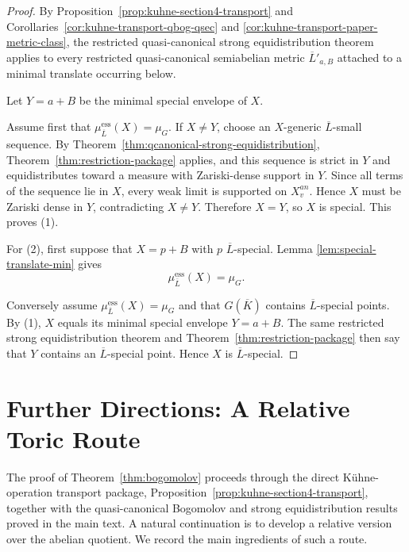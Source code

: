 \documentclass[10pt,a4paper]{amsart}
\theoremstyle{plain}
\theoremstyle{plain}
\numberwithin{equation}{section}
\providecommand{\bL}{\overline{L}}
\providecommand{\muess}{\mu^{\mathrm{ess}}}
\begin{document}
\begin{proof}
	By Proposition~\ref{prop:kuhne-section4-transport} and
	Corollaries~\ref{cor:kuhne-transport-qbog-qsec} and
	\ref{cor:kuhne-transport-paper-metric-class}, the restricted quasi-canonical
	strong equidistribution theorem applies to every restricted quasi-canonical
	semiabelian metric \(\bL'_{a,B}\) attached to a minimal translate occurring
	below.
	
	Let \(Y=a+B\) be the minimal special envelope of \(X\).
	
	Assume first that \(\muess_{\bL}(X)=\mu_G\).  If \(X\neq Y\), choose an
	\(X\)-generic \(\bL\)-small sequence.  By
	Theorem~\ref{thm:qcanonical-strong-equidistribution},
	Theorem~\ref{thm:restriction-package} applies, and this sequence is strict in
	\(Y\) and
	equidistributes toward a measure with Zariski-dense support in \(Y\).  Since all
	terms of the sequence lie in \(X\), every weak limit is supported on
	\(X_v^{an}\).  Hence \(X\) must be Zariski dense in \(Y\), contradicting
	\(X\neq Y\).  Therefore \(X=Y\), so \(X\) is special.  This proves (1).
	
	For (2), first suppose that \(X=p+B\) with \(p\) \(\bL\)-special.  Lemma
	\ref{lem:special-translate-min} gives
	\[
	\muess_{\bL}(X)=\mu_G.
	\]
	
	Conversely assume \(\muess_{\bL}(X)=\mu_G\) and that \(G(\overline{K})\) contains
	\(\bL\)-special points.  By (1), \(X\) equals its minimal special envelope
	\(Y=a+B\).  The same restricted strong equidistribution theorem and
	Theorem~\ref{thm:restriction-package} then say that \(Y\) contains an
	\(\bL\)-special point.  Hence \(X\) is \(\bL\)-special.
\end{proof}

\appendix
\section{Further Directions: A Relative Toric Route}
\label{app:relative-route-future-work}

The proof of Theorem~\ref{thm:bogomolov} proceeds through the direct
K\"uhne-operation transport package,
Proposition~\ref{prop:kuhne-section4-transport}, together with the
quasi-canonical Bogomolov and strong equidistribution results proved in the
main text.  A natural continuation is to develop a relative version over the
abelian quotient.  We record the main ingredients of such a route.
\end{document}
